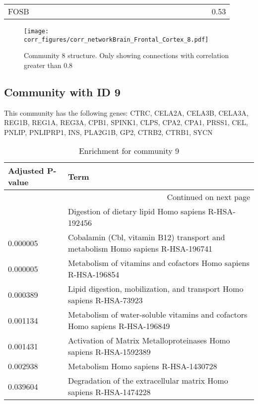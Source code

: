 \begin{longtable}{lrrrrrrrrrrrrrrrrrrrrrrr}
FOSB   &             &            &            &             &              &            &             &              &              &           &             &            &             &             &              &             &           &             &            &              &             &            &       0.53 \\
\end{longtable}


\begin{figure}[h!]
\centering
\texttt{[image: corr\_figures/corr\_networkBrain\_Frontal\_Cortex\_8.pdf]}
\caption{Community 8 structure. Only showing connections with correlation greater than 0.8}
\end{figure}




\subsection*{Community with ID 9}
This community has the following genes: CTRC, CELA2A, CELA3B, CELA3A, REG1B, REG1A, REG3A, CPB1, SPINK1, CLPS, CPA2, CPA1, PRSS1, CEL, PNLIP, PNLIPRP1, INS, PLA2G1B, GP2, CTRB2, CTRB1, SYCN
\\
\begin{longtable}{p{2.4cm}p{14.5cm}}
\caption{Enrichment for community 9}\\
\toprule
Adjusted \newline P-value &                                                                             Term \\
\midrule
\endhead
\midrule
\multicolumn{2}{r}{{Continued on next page}} \\
\midrule
\endfoot

\bottomrule
\endlastfoot
                 0.000004 &                             Digestion of dietary lipid Homo sapiens R-HSA-192456 \\
                 0.000005 &  Cobalamin (Cbl, vitamin B12) transport and metabolism Homo sapiens R-HSA-196741 \\
                 0.000005 &                   Metabolism of vitamins and cofactors Homo sapiens R-HSA-196854 \\
                 0.000389 &            Lipid digestion, mobilization, and transport Homo sapiens R-HSA-73923 \\
                 0.001134 &     Metabolism of water-soluble vitamins and cofactors Homo sapiens R-HSA-196849 \\
                 0.001431 &               Activation of Matrix Metalloproteinases Homo sapiens R-HSA-1592389 \\
                 0.002938 &                                            Metabolism Homo sapiens R-HSA-1430728 \\
                 0.039604 &               Degradation of the extracellular matrix Homo sapiens R-HSA-1474228 \\
\end{longtable}


